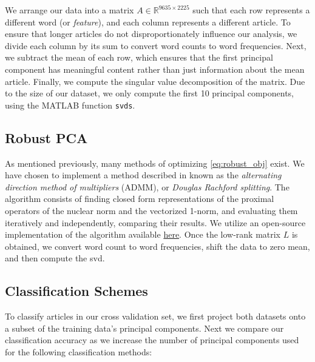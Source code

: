 \documentclass[12pt]{article}
\newcommand{\R}{\mathbb{R}}
\begin{document}
\noindent We arrange our data into a matrix $A \in \R^{9635 \times 2225}$ such that each row represents a different word (or \emph{feature}), and each column represents a different article. To ensure that longer articles do not disproportionately influence our analysis, we divide each column by its sum to convert word counts to word frequencies. Next, we subtract the mean of each row, which ensures that the first principal component has meaningful content rather than just information about the mean article. Finally, we compute the singular value decomposition of the matrix. Due to the size of our dataset, we only compute the first 10 principal components, using the MATLAB function {\tt svds}. 

\subsection{Robust PCA}
As mentioned previously, many methods of optimizing \eqref{eq:robust_obj} exist. We have chosen to implement a method described in \cite{prox} known as the \emph{alternating direction method of multipliers} (ADMM), or \emph{Douglas Rachford splitting}. The algorithm consists of finding closed form representations of the proximal operators of the nuclear norm and the vectorized 1-norm, and evaluating them iteratively and independently, comparing their results.  We utilize an open-source implementation of the algorithm available {\color{blue} \href{http://stanford.edu/~boyd/admm.html}{here}}. Once the low-rank matrix $L$ is obtained, we convert word count to word frequencies, shift the data to zero mean, and then compute the svd. 

\subsection{Classification Schemes}

To classify articles in our cross validation set, we first project both datasets onto a subset of the training data's principal components. Next we compare our classification accuracy as we increase the number of principal components used for the following classification methods:
\end{document}
